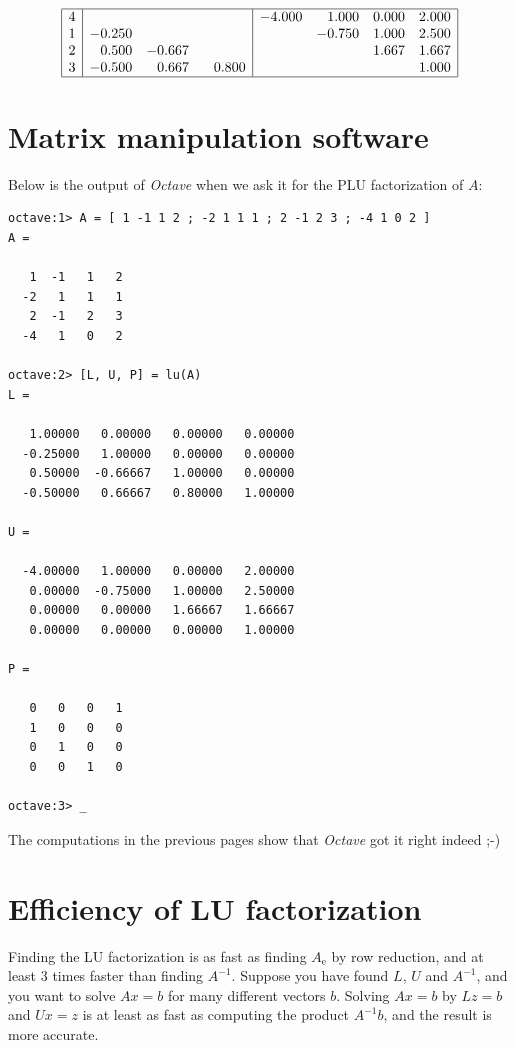\documentclass[11pt]{article}
\newcommand{\1}{\mathbf{1}}
\newcommand{\e}{{\mathrm{e}}}
\newcommand{\0}{\mathbf{0}}
\begin{document}
\[
\begin{array}{|r|rrr|rrrr|}
\hline
  4	& \phantom{-0.000}&\phantom{-0.000}&\phantom{-0.000}& -4.000	&  1.000	&  0.000	&  2.000 \\
  1	& -0.250	&  		&		& 		& -0.750	&  1.000	&  2.500 \\
  2	&  0.500 	& -0.667	& 		& 		& 		&  1.667	&  1.667 \\
  3	& -0.500	&  0.667	&  0.800	& 		& 		&  		&  1.000 \\
\hline
\end{array}
\]

\pagebreak[4]

\section*{Matrix manipulation software}

Below is the output of \emph{Octave} when we ask it for the PLU factorization of $A$:

\begin{verbatim}
octave:1> A = [ 1 -1 1 2 ; -2 1 1 1 ; 2 -1 2 3 ; -4 1 0 2 ]
A =

   1  -1   1   2
  -2   1   1   1
   2  -1   2   3
  -4   1   0   2

octave:2> [L, U, P] = lu(A)
L =

   1.00000   0.00000   0.00000   0.00000
  -0.25000   1.00000   0.00000   0.00000
   0.50000  -0.66667   1.00000   0.00000
  -0.50000   0.66667   0.80000   1.00000

U =

  -4.00000   1.00000   0.00000   2.00000
   0.00000  -0.75000   1.00000   2.50000
   0.00000   0.00000   1.66667   1.66667
   0.00000   0.00000   0.00000   1.00000

P =

   0   0   0   1
   1   0   0   0
   0   1   0   0
   0   0   1   0

octave:3> _
\end{verbatim}

The computations in the previous pages show that \emph{Octave} got it right indeed ;-)

\pagebreak[4]

\section*{Efficiency of LU factorization}

Finding the LU factorization is as fast as finding $A_\e$ by row reduction, and at least 3 times faster than finding $A^{-1}$.
Suppose you have found $L$, $U$ and $A^{-1}$, and you want to solve $Ax=b$ for many different vectors $b$.
Solving $Ax=b$ by $Lz=b$ and $Ux=z$ is at least as fast as computing the product $A^{-1}b$, and the result is more accurate.
\end{document}
